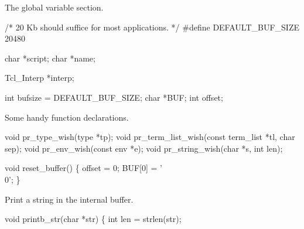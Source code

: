 
The global variable section.

\nwenddocs{}\endmoddef\let\nwnotused=\nwoutput{}\nwstartdeflinemarkup{}\nwenddeflinemarkup
/* 20 Kb should suffice for most applications. */
#define DEFAULT_BUF_SIZE        20480

char *script;
char *name;

Tcl_Interp *interp;

int bufsize = DEFAULT_BUF_SIZE;
char *BUF;
int offset;
\nwendcode{}\nwdocspar


Some handy function declarations.

\nwenddocs{}\endmoddef\let\nwnotused=\nwoutput{}\nwstartdeflinemarkup{}\nwenddeflinemarkup
void pr_type_wish(type *tp);
void pr_term_list_wish(const term_list *tl, char sep);
void pr_env_wish(const env *e);
void pr_string_wish(char *s, int len);
\nwendcode{}\nwdocspar



\nwenddocs{}\endmoddef\let\nwnotused=\nwoutput{}\nwstartdeflinemarkup{}\nwenddeflinemarkup
void reset_buffer()
\{
  offset = 0;
  BUF[0] = '\\0';
\}
\nwendcode{}\nwdocspar


Print a string in the internal buffer.

\nwenddocs{}\endmoddef\let\nwnotused=\nwoutput{}\nwstartdeflinemarkup{}\nwenddeflinemarkup
void printb_str(char *str)
\{
  int len = strlen(str);

